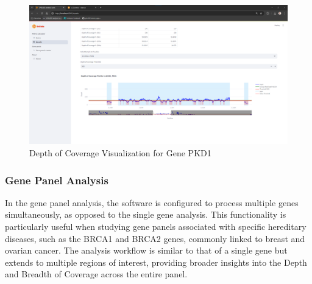 \begin{itemize}
    \begin{figure}[H]
        \centering
        \includegraphics[width=\textwidth]{figs/v3.5.png}
        \caption{Depth of Coverage Visualization for Gene PKD1}
        \label{fig:coverage_plot}
    \end{figure}
\end{itemize}

\subsubsection{\textbf{Gene Panel Analysis}}

In the gene panel analysis, the software is configured to process multiple genes simultaneously, as opposed to the single gene analysis. This functionality is particularly useful when studying gene panels associated with specific hereditary diseases, such as the BRCA1 and BRCA2 genes, commonly linked to breast and ovarian cancer. The analysis workflow is similar to that of a single gene but extends to multiple regions of interest, providing broader insights into the Depth and Breadth of Coverage across the entire panel.

